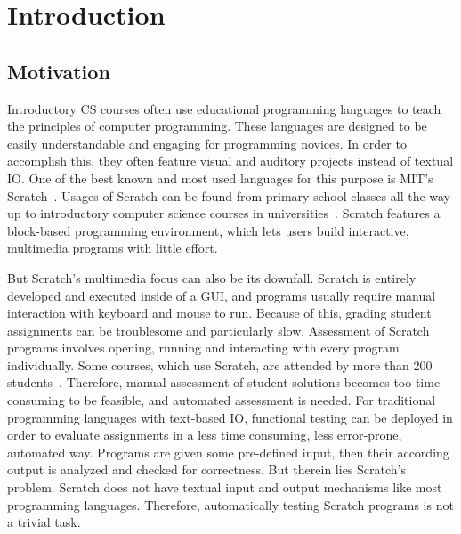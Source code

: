 
\chapter{Introduction}

\section{Motivation}

Introductory CS courses often use educational programming languages to teach the principles of computer programming.
These languages are designed to be easily understandable and engaging for programming novices.
In order to accomplish this, they often feature visual and auditory projects instead of textual IO.
One of the best known and most used languages for this purpose is MIT's Scratch~\cite{scratch, scratchproject}.
Usages of Scratch can be found from primary school classes all the way up to introductory computer science courses in universities~\cite{itch, hairball}.
Scratch features a block-based programming environment, which lets users build interactive, multimedia programs with little effort.
\parspace

But Scratch's multimedia focus can also be its downfall.
Scratch is entirely developed and executed inside of a GUI, and programs usually require manual interaction with keyboard and mouse to run.
Because of this, grading student assignments can be troublesome and particularly slow.
Assessment of Scratch programs involves opening, running and interacting with every program individually.
Some courses, which use Scratch, are attended by more than 200 students~\cite{itch}.
Therefore, manual assessment of student solutions becomes too time consuming to be feasible, and automated assessment is needed.
For traditional programming languages with text-based IO, functional testing can be deployed in order to evaluate assignments in a less time consuming, less error-prone, automated way.
Programs are given some pre-defined input, then their according output is analyzed and checked for correctness.
But therein lies Scratch's problem.
Scratch does not have textual input and output mechanisms like most programming languages.
Therefore, automatically testing Scratch programs is not a trivial task.
\parspace

